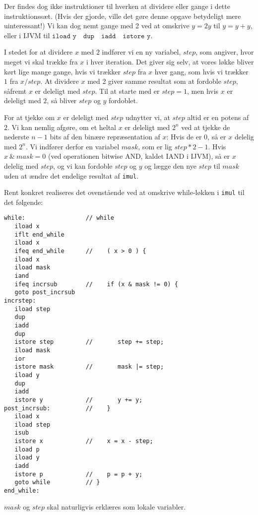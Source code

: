 \documentclass[12pt,a4paper]{article}
\newcommand{\imul}{\texttt{imul}}
\begin{document}
Der findes dog ikke instruktioner til hverken at dividere eller gange i dette
instruktionssæt. (Hvis der gjorde, ville det gøre denne opgave betydeligt mere
uinteressant!) Vi kan dog nemt gange med 2 ved at omskrive $y=2y$ til
$y=y+y$, eller i IJVM til $\texttt{iload y} \quad \texttt{dup} \quad
\texttt{iadd} \quad \texttt{istore y}$.

I stedet for at dividere $x$ med $2$ indfører vi en ny variabel, $step$, som
angiver, hvor meget vi skal trække fra $x$ i hver iteration. Det giver sig
selv, at vores løkke bliver kørt lige mange gange, hvis vi trækker $step$ fra
$x$ hver gang, som hvis vi trækker $1$ fra $x/step$. At dividere $x$ med 2
giver samme resultat som at fordoble $step$, såfremt $x$ er deleligt med
$step$. Til at starte med er $step=1$, men hvis $x$ er deleligt med $2$, så
bliver $step$ og $y$ fordoblet.

For at tjekke om $x$ er deleligt med $step$ udnytter vi, at $step$ altid er en
potens af $2$. Vi kan nemlig afgøre, om et heltal $x$ er deleligt med $2^n$ ved
at tjekke de nederste $n-1$ bits af den binære repræsentation af $x$: Hvis de
er $0$, så er $x$ delelig med $2^n$. Vi indfører derfor en variabel $mask$, som
er lig $step*2-1$. Hvis $x\ \&\ mask=0$ (ved operationen bitwise AND, kaldet
IAND i IJVM), så er $x$ delelig med $step$, og vi kan fordoble $step$ og $y$ og
lægge den nye $step$ til $mask$ uden at ændre det endelige resultat af \imul.

Rent konkret realiseres det ovenstående ved at omskrive while-løkken i \imul{} til det følgende:

\begin{lstlisting}
while:                 // while
   iload x
   iflt end_while
   iload x
   ifeq end_while      //    ( x > 0 ) {
   iload x
   iload mask
   iand
   ifeq incrsub        //    if (x & mask != 0) {
   goto post_incrsub
incrstep:
   iload step
   dup
   iadd
   dup
   istore step         //       step += step;
   iload mask
   ior
   istore mask         //       mask |= step;
   iload y
   dup
   iadd
   istore y            //       y += y;
post_incrsub:          //    }
   iload x
   iload step
   isub
   istore x            //    x = x - step;
   iload p
   iload y
   iadd
   istore p            //    p = p + y;
   goto while          // }
end_while:
\end{lstlisting}

$mask$ og $step$ skal naturligvis erklæres som lokale variabler.
\end{document}
